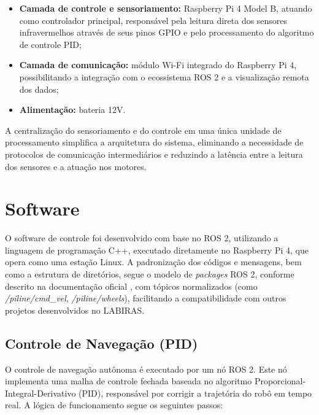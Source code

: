 \begin{itemize}
	\item \textbf{Camada de controle e sensoriamento:} Raspberry Pi 4 Model B, atuando como controlador principal, responsável pela leitura direta dos sensores infravermelhos através de seus pinos GPIO e pelo processamento do algoritmo de controle PID;
	\item \textbf{Camada de comunicação:} módulo Wi-Fi integrado do Raspberry Pi 4, possibilitando a integração com o ecossistema ROS 2 e a visualização remota dos dados;
	\item \textbf{Alimentação:} bateria 12V.
\end{itemize}

A centralização do sensoriamento e do controle em uma única unidade de processamento simplifica a arquitetura do sistema, eliminando a necessidade de protocolos de comunicação intermediários e reduzindo a latência entre a leitura dos sensores e a atuação nos motores.


\section{Software}

O software de controle foi desenvolvido com base no ROS 2, utilizando a linguagem de programação C++, executado diretamente no Raspberry Pi 4, que opera como uma estação Linux. A padronização dos códigos e mensagens, bem como a estrutura de diretórios, segue o modelo de \textit{packages} ROS 2, conforme descrito na documentação oficial \cite{ros2_humble_create_package}, com tópicos normalizados (como \textit{/piline/cmd\_vel}, \textit{/piline/wheels}), facilitando a compatibilidade com outros projetos desenvolvidos no LABIRAS.


\subsection{Controle de Navegação (PID)}

O controle de navegação autônoma é executado por um nó ROS 2. Este nó implementa uma malha de controle fechada baseada no algoritmo Proporcional-Integral-Derivativo (PID), responsável por corrigir a trajetória do robô em tempo real. A lógica de funcionamento segue os seguintes passos:

